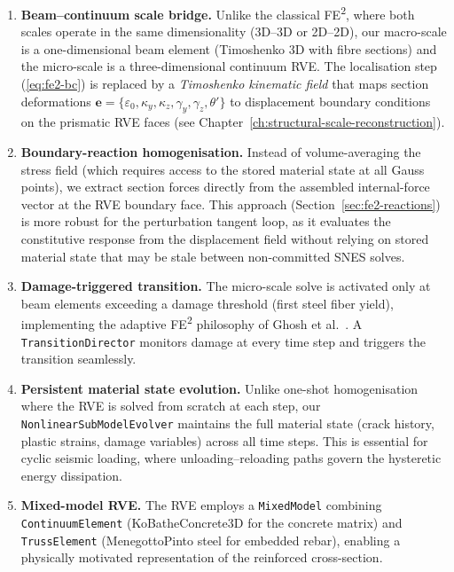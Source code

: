 \begin{enumerate}[label=(\arabic*)]
  \item \textbf{Beam--continuum scale bridge.}
    Unlike the classical FE\textsuperscript{2}, where both scales
    operate in the same dimensionality (3D--3D or 2D--2D), our
    macro-scale is a one-dimensional beam element (Timoshenko 3D with
    fibre sections) and the micro-scale is a three-dimensional
    continuum RVE.  The localisation step
    (\ref{eq:fe2-bc}) is replaced by a \emph{Timoshenko kinematic
    field} that maps section deformations
    $\mathbf{e} = \{\varepsilon_0, \kappa_y, \kappa_z, \gamma_y,
    \gamma_z, \theta'\}$ to displacement boundary conditions on the
    prismatic RVE faces (see
    Chapter~\ref{ch:structural-scale-reconstruction}).

  \item \textbf{Boundary-reaction homogenisation.}
    Instead of volume-averaging the stress field (which requires
    access to the stored material state at all Gauss points), we
    extract section forces directly from the assembled
    internal-force vector at the RVE boundary face.  This approach
    (Section~\ref{sec:fe2-reactions}) is more robust for the
    perturbation tangent loop, as it evaluates the constitutive
    response from the displacement field without relying on stored
    material state that may be stale between non-committed SNES
    solves.

  \item \textbf{Damage-triggered transition.}
    The micro-scale solve is activated only at beam elements exceeding
    a damage threshold (first steel fiber yield), implementing the
    adaptive FE\textsuperscript{2} philosophy of Ghosh et al.\
    \cite{Ghosh2001}.  A \texttt{TransitionDirector} monitors damage
    at every time step and triggers the transition seamlessly.

  \item \textbf{Persistent material state evolution.}
    Unlike one-shot homogenisation where the RVE is solved from
    scratch at each step, our \texttt{NonlinearSubModelEvolver}
    maintains the full material state (crack history, plastic strains,
    damage variables) across all time steps.  This is essential for
    cyclic seismic loading, where unloading--reloading paths govern
    the hysteretic energy dissipation.

  \item \textbf{Mixed-model RVE.}
    The RVE employs a \texttt{MixedModel} combining
    \texttt{ContinuumElement} (KoBatheConcrete3D for the concrete
    matrix) and \texttt{TrussElement} (MenegottoPinto steel for
    embedded rebar), enabling a physically motivated representation
    of the reinforced cross-section.


\end{enumerate}
